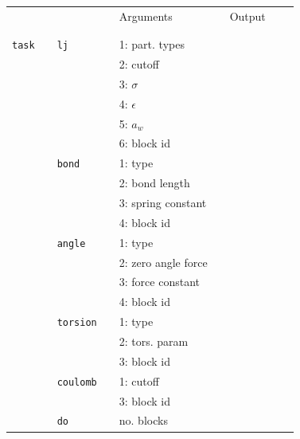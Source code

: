 \documentclass[11pt]{article}
\begin{document}
\clearpage
\begin{center}
  
  \begin{tabular}{cclclclll}
    {\color{red}{\textbf{Action}}} && {\color{blue}{Specifier}} && Arguments && Output \\
                                   && && && \\
    \hline
                                   && && && \\
    \verb!task! && \verb!lj!       && 1: part. types && \\
                                   && && 2: cutoff&& \\
                                   && && 3: $\sigma$ && \\
                                   && && 4: $\epsilon$ && \\
                                   && && 5: $a_w$ && \\
                                   && && 6: block id \\ 
                    && \verb!bond! && 1: type && \\  
                    &&             && 2: bond length && \\
                                   &&             && 3: spring constant && \\
                                   && && 4: block id \\
                    && \verb!angle!&& 1: type && \\  
                    &&             && 2: zero angle force && \\
                                   &&             && 3: force constant && \\
                                   && && 4: block id \\
                    && \verb!torsion! && 1: type && \\  
                                   &&             && 2: tors. param && \\
                                   && && 3: block id \\
                   && \verb!coulomb! && 1: cutoff && \\  
                   &&                && 3: block id && \\
                   && \verb!do! && no. blocks && \\
  \end{tabular}

\end{center}
\end{document}
